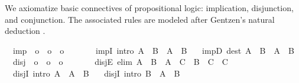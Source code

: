 \begin{isabellebody}
\begin{isamarkuptext}
\end{isamarkuptext}%
\isamarkuptrue%
\isamarkupfalse%
%
\isamarkuptrue%
%
\begin{isamarkuptext}%
We axiomatize basic connectives of propositional logic: implication,
  disjunction, and conjunction.  The associated rules are modeled
  after Gentzen's natural deduction \cite{Gentzen:1935}.%
\end{isamarkuptext}%
\isamarkuptrue%
\isamarkupfalse%
\isanewline
\ \ imp\ {\isacharcolon}{\isacharcolon}\ {\isachardoublequoteopen}o\ {\isasymRightarrow}\ o\ {\isasymRightarrow}\ o{\isachardoublequoteclose}\ \ {\isacharparenleft}\ {\isachardoublequoteopen}{\isasymlongrightarrow}{\isachardoublequoteclose}\ {}{}{\isacharparenright}\ \isanewline
\ \ impI\ {\isacharbrackleft}intro{\isacharbrackright}{\isacharcolon}\ {\isachardoublequoteopen}{\isacharparenleft}A\ {\isasymLongrightarrow}\ B{\isacharparenright}\ {\isasymLongrightarrow}\ A\ {\isasymlongrightarrow}\ B{\isachardoublequoteclose}\ \isanewline
\ \ impD\ {\isacharbrackleft}dest{\isacharbrackright}{\isacharcolon}\ {\isachardoublequoteopen}{\isacharparenleft}A\ {\isasymlongrightarrow}\ B{\isacharparenright}\ {\isasymLongrightarrow}\ A\ {\isasymLongrightarrow}\ B{\isachardoublequoteclose}\isanewline
\isanewline
{}\isamarkupfalse%
\isanewline
\ \ disj\ {\isacharcolon}{\isacharcolon}\ {\isachardoublequoteopen}o\ {\isasymRightarrow}\ o\ {\isasymRightarrow}\ o{\isachardoublequoteclose}\ \ {\isacharparenleft}\ {\isachardoublequoteopen}{\isasymor}{\isachardoublequoteclose}\ {}{}{\isacharparenright}\ \isanewline
\ \ disjE\ {\isacharbrackleft}elim{\isacharbrackright}{\isacharcolon}\ {\isachardoublequoteopen}A\ {\isasymor}\ B\ {\isasymLongrightarrow}\ {\isacharparenleft}A\ {\isasymLongrightarrow}\ C{\isacharparenright}\ {\isasymLongrightarrow}\ {\isacharparenleft}B\ {\isasymLongrightarrow}\ C{\isacharparenright}\ {\isasymLongrightarrow}\ C{\isachardoublequoteclose}\ \isanewline
\ \ disjI\ {\isacharbrackleft}intro{\isacharbrackright}{\isacharcolon}\ {\isachardoublequoteopen}A\ {\isasymLongrightarrow}\ A\ {\isasymor}\ B{\isachardoublequoteclose}\ \isanewline
\ \ disjI\ {\isacharbrackleft}intro{\isacharbrackright}{\isacharcolon}\ {\isachardoublequoteopen}B\ {\isasymLongrightarrow}\ A\ {\isasymor}\ B{\isachardoublequoteclose}\isanewline

\end{isabellebody}
